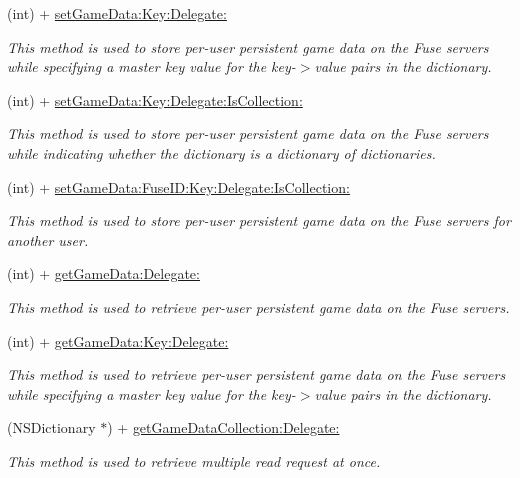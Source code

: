\begin{DoxyCompactItemize}
(int) + \hyperlink{interface_fuse_a_p_i_ac8a836c71715abcb95c0888862c61331}{set\+Game\+Data\+:\+Key\+:\+Delegate\+:}
\begin{DoxyCompactList}\small\item\em This method is used to store per-\/user persistent game data on the Fuse servers while specifying a master key value for the key-\/$>$value pairs in the dictionary. \end{DoxyCompactList}\item 
(int) + \hyperlink{interface_fuse_a_p_i_adc2da6abb47d6f1abefb266f35e4237c}{set\+Game\+Data\+:\+Key\+:\+Delegate\+:\+Is\+Collection\+:}
\begin{DoxyCompactList}\small\item\em This method is used to store per-\/user persistent game data on the Fuse servers while indicating whether the dictionary is a dictionary of dictionaries. \end{DoxyCompactList}\item 
(int) + \hyperlink{interface_fuse_a_p_i_a39a43d9ba98ab52c258dca947552cfce}{set\+Game\+Data\+:\+Fuse\+I\+D\+:\+Key\+:\+Delegate\+:\+Is\+Collection\+:}
\begin{DoxyCompactList}\small\item\em This method is used to store per-\/user persistent game data on the Fuse servers for another user. \end{DoxyCompactList}\item 
(int) + \hyperlink{interface_fuse_a_p_i_a45365af9ff3e5defee7e63de10374ad1}{get\+Game\+Data\+:\+Delegate\+:}
\begin{DoxyCompactList}\small\item\em This method is used to retrieve per-\/user persistent game data on the Fuse servers. \end{DoxyCompactList}\item 
(int) + \hyperlink{interface_fuse_a_p_i_a22bb00fc5a37e4ced3509409a46a7c6e}{get\+Game\+Data\+:\+Key\+:\+Delegate\+:}
\begin{DoxyCompactList}\small\item\em This method is used to retrieve per-\/user persistent game data on the Fuse servers while specifying a master key value for the key-\/$>$value pairs in the dictionary. \end{DoxyCompactList}\item 
(N\+S\+Dictionary $\ast$) + \hyperlink{interface_fuse_a_p_i_ae19c5be71f4cf1c1d444500f697d5d54}{get\+Game\+Data\+Collection\+:\+Delegate\+:}
\begin{DoxyCompactList}\small\item\em This method is used to retrieve multiple read request at once. \end{DoxyCompactList}\item 

\end{DoxyCompactItemize}
